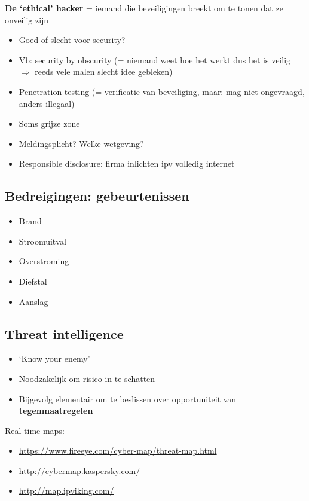 \documentclass{article}
\newcommand{\bold}[1]{\textbf{#1}}
\begin{document}
\bold{De `ethical' hacker}
= iemand die beveiligingen breekt om te tonen dat ze onveilig zijn

\begin{itemize}
    \item Goed of slecht voor security?
    \item Vb: security by obscurity (= niemand weet hoe het werkt dus het is veilig $\Rightarrow$ reeds vele malen slecht idee gebleken)
    \item Penetration testing (= verificatie van beveiliging, maar: mag niet ongevraagd, anders illegaal)
    \item Soms grijze zone
    \item Meldingsplicht? Welke wetgeving? 
    \item Responsible disclosure: firma inlichten ipv volledig internet
\end{itemize}

\subsection{Bedreigingen: gebeurtenissen}

\begin{itemize}
    \item Brand
    \item Stroomuitval
    \item Overstroming
    \item Diefstal
    \item Aanslag
\end{itemize}


\subsection{Threat intelligence}

\begin{itemize}
    \item `Know your enemy'
    \item Noodzakelijk om risico in te schatten
    \item Bijgevolg elementair om te beslissen over opportuniteit van \bold{tegenmaatregelen}
\end{itemize}

Real-time maps:

\begin{itemize}
    \item \url{https://www.fireeye.com/cyber-map/threat-map.html}
    \item \url{http://cybermap.kaspersky.com/}
    \item \url{http://map.ipviking.com/}
\end{itemize}
\end{document}
